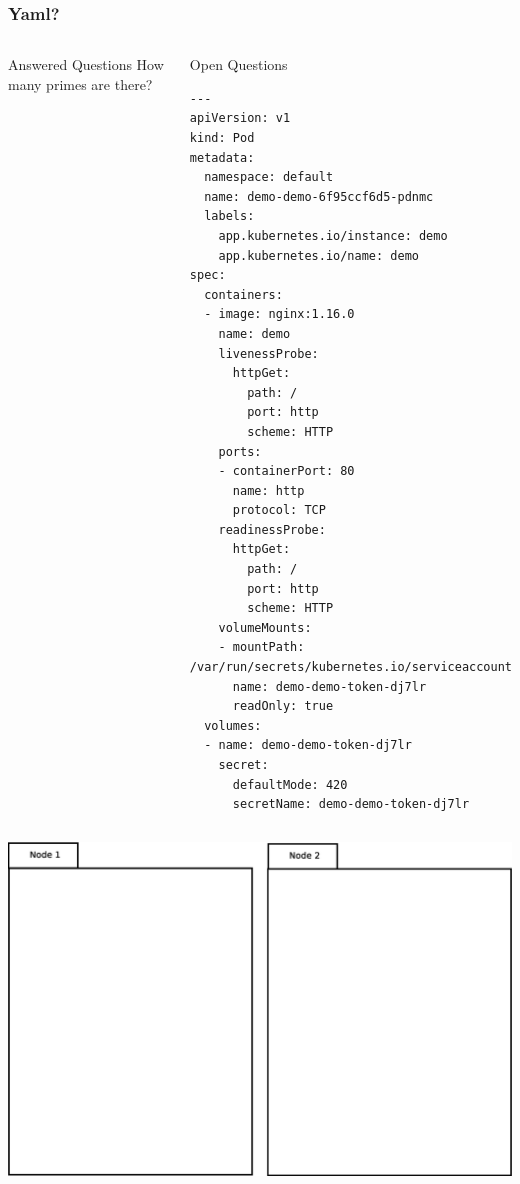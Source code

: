 \documentclass{beamer}
\begin{document}
\begin{frame}[fragile]
\frametitle{Yaml?}
\begin{columns}
    \begin{block}{Answered Questions}
        How many primes are there?
    \end{block}
    \begin{block}{Open Questions}
\begin{verbatim}
---
apiVersion: v1
kind: Pod
metadata:
  namespace: default
  name: demo-demo-6f95ccf6d5-pdnmc
  labels:
    app.kubernetes.io/instance: demo
    app.kubernetes.io/name: demo
spec:
  containers:
  - image: nginx:1.16.0
    name: demo
    livenessProbe:
      httpGet:
        path: /
        port: http
        scheme: HTTP
    ports:
    - containerPort: 80
      name: http
      protocol: TCP
    readinessProbe:
      httpGet:
        path: /
        port: http
        scheme: HTTP
    volumeMounts:
    - mountPath: /var/run/secrets/kubernetes.io/serviceaccount
      name: demo-demo-token-dj7lr
      readOnly: true
  volumes:
  - name: demo-demo-token-dj7lr
    secret:
      defaultMode: 420
      secretName: demo-demo-token-dj7lr

\end{verbatim}
    \end{block}
\end{columns}
\end{frame}

\begin{frame}
\includegraphics[width=\textwidth,height=\textheight,keepaspectratio]{graphics/00-nodes.eps}
\end{frame}
\end{document}
